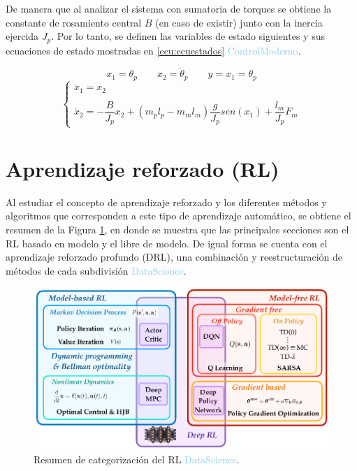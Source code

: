 De manera que al analizar el sistema con sumatoria de torques se obtiene la constante de rosamiento central $B$ (en caso de existir) junto con la inercia ejercida $J_p$. Por lo tanto, se definen las variables de estado siguientes y sus ecuaciones de estado mostradas en \ref{ecu:ecuestados} \textcolor{SkyBlue}{ControlModerno}.

\[x_1 = \theta_p \qquad x_2 = \dot{\theta}_p \qquad y = x_1 = \theta_p\]
\begin{equation}
	\left \{ \begin{array}{lcc} \dot{x}_1 = x_2 \\ \\ \dot{x}_2 = -\dfrac{B}{J_p} x_2 + (m_p l_p -m_m l_m)\dfrac{g}{J_p}sen(x_1) +\dfrac{l_m}{J_p}F_m \end{array} \right.
	\label{ecu:ecuestados}
\end{equation}




\section{Aprendizaje reforzado (RL)}


Al estudiar el concepto de aprendizaje reforzado y los diferentes métodos y algoritmos que corresponden a este tipo de aprendizaje automático, se obtiene el resumen de la Figura \ref{fig:teoriaRL}, en donde se muestra que las principales secciones son el RL basado en modelo y el libre de modelo. De igual forma se cuenta con el aprendizaje reforzado profundo (DRL), una combinación y reestructuración de métodos de cada subdivisión \textcolor{SkyBlue}{DataScience}.

\begin{figure}[hh]
	\centering
	\includegraphics[scale=0.35]{fig/new/CatRL.png}
	\caption{Resumen de categorización del RL \textcolor{SkyBlue}{DataScience}.}
	\label{fig:teoriaRL}
\end{figure}


